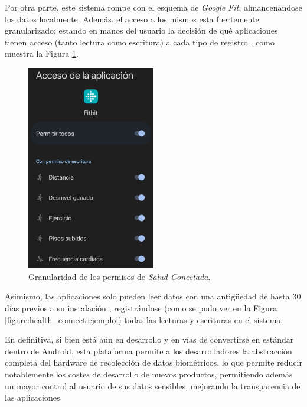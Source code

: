         Por otra parte, este sistema rompe con el esquema de \textit{Google Fit}, almancenándose los datos localmente. Además, el acceso a los mismos esta fuertemente granularizado; estando en manos del usuario la decisión de qué aplicaciones tienen acceso (tanto lectura como escritura) a cada tipo de registro \cite{saez_google_2022}, como muestra la Figura \ref{figure:health_connect:granularidad_permisos}. 

        \begin{figure}[h]
            \centering
            \includegraphics[width=0.5\textwidth]{figures/Health connect permisos fitbit.jpg}
            \caption[Granularidad de los permisos de \textit{Salud Conectada}.]
            {Granularidad de los permisos de \textit{Salud Conectada}.}
            \label{figure:health_connect:granularidad_permisos}
        \end{figure}

        
        Asimismo, las aplicaciones solo pueden leer datos con una antigüedad de hasta 30 días previos a su instalación \cite{android_developers_preguntas_nodate}, registrándose (como se pudo ver en la Figura \ref{figure:health_connect:ejemplo}) todas las lecturas y escrituras en el sistema.

        En definitiva, si bien está aún en desarrollo y en vías de convertirse en estándar dentro de Android, esta plataforma permite a los desarrolladores la abstracción completa del hardware de recolección de datos biométricos, lo que permite reducir notablemente los costes de desarrollo de nuevos productos, permitiendo además un mayor control al usuario de sus datos sensibles, mejorando la transparencia de las aplicaciones.

